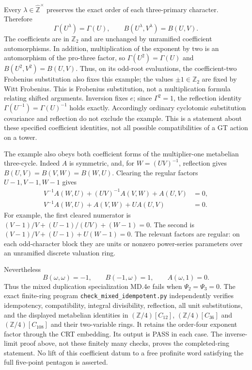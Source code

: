 Every $\lambda\in\widehat{\mathbb Z}^{\times}$ preserves the
exact order of each three-primary character. Therefore
\[
 \Gamma(U^\lambda)=\Gamma(U),\qquad
 B(U^\lambda,V^\lambda)=B(U,V).
\]
The coefficients are in $\mathbb Z_2$ and are unchanged by
unramified coefficient automorphisms. In addition, multiplication
of the exponent by two is an automorphism of the pro-three
factor, so $\Gamma(U^2)=\Gamma(U)$ and
$B(U^2,V^2)=B(U,V)$. Thus, on its odd-root evaluations, the
coefficient-two Frobenius substitution also fixes this example;
the values $\pm1\in\mathbb Z_2$ are fixed by Witt Frobenius.
This is Frobenius substitution, not a multiplication formula
relating shifted arguments. Inversion fixes $e$;
since $\Gamma^2=1$, the reflection identity
$\Gamma(U^{-1})=\Gamma(U)^{-1}$ holds exactly.
Accordingly ordinary cyclotomic substitution covariance and
reflection do not exclude the example. This is a statement about
these specified coefficient identities, not all possible
compatibilities of a GT action on a tower.

The example also obeys both coefficient forms of the
multiplier-one metabelian three-cycle. Indeed $A$ is symmetric,
and, for $W=(UV)^{-1}$, reflection gives
$B(U,V)=B(V,W)=B(W,U)$. Clearing the regular factors
$U-1,V-1,W-1$ gives
\[
\begin{split}
 V^{-1}A(W,U)+(UV)^{-1}A(V,W)+A(U,V)&=0,\\
 V^{-1}A(W,U)+A(V,W)+U A(U,V)&=0.
\end{split}
\]
For example, the first cleared numerator is
$(V-1)/V+(U-1)/(UV)+(W-1)=0$.
The second is $(V-1)/V+(U-1)+U(W-1)=0$.
The relevant factors are regular: on each odd-character block
they are units or nonzero power-series parameters over an
unramified discrete valuation ring.

Nevertheless
\[
 B(\omega,\omega)=-1,\qquad B(-1,\omega)=1,
 \qquad A(\omega,1)=0.
\]
Thus the mixed duplication specialization MD.4e fails when
$\Psi_2=\Psi_3=0$. The exact finite-ring program
\texttt{check\_mixed\_idempotent.py} independently verifies
idempotency, compatibility, integral divisibility, reflection,
all unit substitutions, and the displayed metabelian identities
in $(\mathbb Z/4)[C_{12}]$, $(\mathbb Z/4)[C_{36}]$ and
$(\mathbb Z/4)[C_{108}]$ and their two-variable rings.
It retains the order-four exponent factor through the CRT embedding.
Its output is PASS in each case. The inverse-limit proof above,
not these finitely many checks, proves the completed-ring statement.
No lift of this coefficient datum to a free profinite word satisfying
the full five-point pentagon is asserted.

